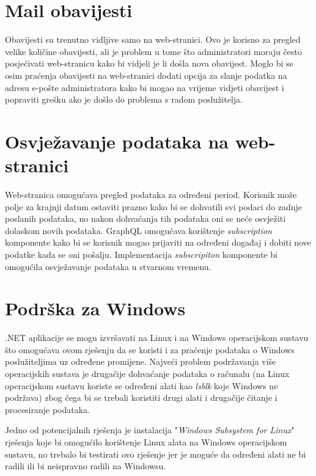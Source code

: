 \documentclass[zavrsnirad]{fer}
\begin{document}
\section{Mail obavijesti}
Obavijesti su trenutno vidljive samo na web-stranici. Ovo je korisno za pregled velike količine obavijesti, ali je problem u tome što administratori moraju često posjećivati web-stranicu kako bi vidjeli je li došla nova obavijest. Moglo bi se osim praćenja obavijesti na web-stranici dodati opcija za slanje podatka na adresu e-pošte administratora kako bi mogao na vrijeme vidjeti obavijest i popraviti grešku ako je došlo do problema s radom poslužitelja.

\section{Osvježavanje podataka na web-stranici}
Web-stranica omogućava pregled podataka za određeni period. Korisnik može polje za krajnji datum ostaviti prazno kako bi se dohvatili svi podaci do zadnje poslanih podataka, no nakon dohvaćanja tih podataka oni se neće osvježiti dolaskom novih podataka. GraphQL omogućava korištenje \textit{subscription} komponente kako bi se korisnik mogao prijaviti na određeni događaj i dobiti nove podatke kada se oni pošalju. Implementacija \textit{subscripiton} komponente bi omogućila osvježavanje podataka u stvarnom vremenu.

\section{Podrška za Windows}
.NET aplikacije se mogu izvršavati na Linux i na Windows operacijskom sustavu što omogućava ovom rješenju da se koristi i za praćenje podataka o Windows poslužiteljima uz određene promijene. Najveći problem podržavanja više operacijskih sustava je drugačije dohvaćanje podataka o računalu (na Linux operacijskom sustavu koriste se određeni alati kao \textit{lsblk} koje Windows ne podržava) zbog čega bi se trebali koristiti drugi alati i drugačije čitanje i procesiranje podataka.

Jedno od potencijalnih rješenja je instalacija "\textit{Windows Subsystem for Linux}" rješenja koje bi omogućilo korištenje Linux alata na Windows operacijskom sustavu, no trebalo bi testirati ovo rješenje jer je moguće da određeni alati ne bi radili ili bi neispravno radili na Windowsu.

\end{document}
